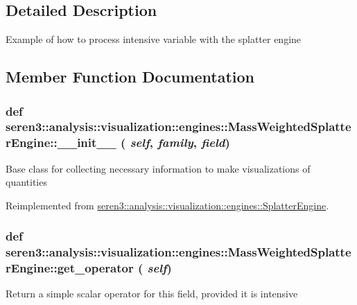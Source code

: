 \subsection{Detailed Description}
\begin{DoxyVerb}
Example of how to process intensive variable with the splatter engine
\end{DoxyVerb}
 

\subsection{Member Function Documentation}
\hypertarget{classseren3_1_1analysis_1_1visualization_1_1engines_1_1MassWeightedSplatterEngine_ac4d8bdd7049a6d50e5316fbb7777ad0a}{
\subsubsection[{\_\-\_\-init\_\-\_\-}]{\setlength{\rightskip}{0pt plus 5cm}def seren3::analysis::visualization::engines::MassWeightedSplatterEngine::\_\-\_\-init\_\-\_\- ( {\em self}, \/   {\em family}, \/   {\em field})}}
\label{classseren3_1_1analysis_1_1visualization_1_1engines_1_1MassWeightedSplatterEngine_ac4d8bdd7049a6d50e5316fbb7777ad0a}
\begin{DoxyVerb}
    Base class for collecting necessary information to make visualizations of quantities
\end{DoxyVerb}
 

Reimplemented from \hyperlink{classseren3_1_1analysis_1_1visualization_1_1engines_1_1SplatterEngine_acb5713fdebb0354f14b8d3e1d00fc05b}{seren3::analysis::visualization::engines::SplatterEngine}.\hypertarget{classseren3_1_1analysis_1_1visualization_1_1engines_1_1MassWeightedSplatterEngine_ac29562a7446004938fbae70a684847c5}{
\subsubsection[{get\_\-operator}]{\setlength{\rightskip}{0pt plus 5cm}def seren3::analysis::visualization::engines::MassWeightedSplatterEngine::get\_\-operator ( {\em self})}}
\label{classseren3_1_1analysis_1_1visualization_1_1engines_1_1MassWeightedSplatterEngine_ac29562a7446004938fbae70a684847c5}
\begin{DoxyVerb}
Return a simple scalar operator for this field, provided it is intensive
\end{DoxyVerb}
 

